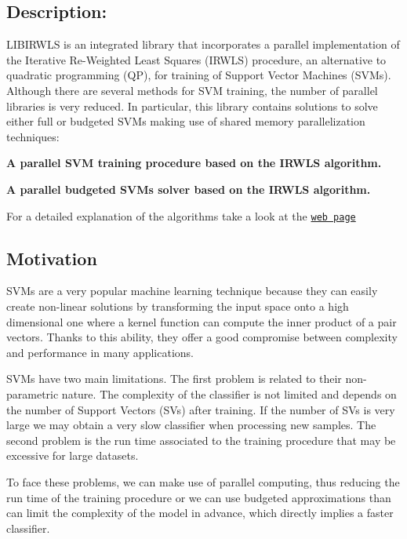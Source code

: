 \subsection*{Description\+: }

L\+I\+B\+I\+R\+W\+LS is an integrated library that incorporates a parallel implementation of the Iterative Re-\/\+Weighted Least Squares (I\+R\+W\+LS) procedure, an alternative to quadratic programming (QP), for training of Support Vector Machines (S\+V\+Ms). Although there are several methods for S\+VM training, the number of parallel libraries is very reduced. In particular, this library contains solutions to solve either full or budgeted S\+V\+Ms making use of shared memory parallelization techniques\+:

{\bfseries A parallel S\+VM training procedure based on the I\+R\+W\+LS algorithm.}

{\bfseries A parallel budgeted S\+V\+Ms solver based on the I\+R\+W\+LS algorithm.}

For a detailed explanation of the algorithms take a look at the \href{https://robedm.github.io/LIBIRWLS/}{\tt web page}



\subsection*{Motivation }

S\+V\+Ms are a very popular machine learning technique because they can easily create non-\/linear solutions by transforming the input space onto a high dimensional one where a kernel function can compute the inner product of a pair vectors. Thanks to this ability, they offer a good compromise between complexity and performance in many applications.

S\+V\+Ms have two main limitations. The first problem is related to their non-\/parametric nature. The complexity of the classifier is not limited and depends on the number of Support Vectors (S\+Vs) after training. If the number of S\+Vs is very large we may obtain a very slow classifier when processing new samples. The second problem is the run time associated to the training procedure that may be excessive for large datasets.

To face these problems, we can make use of parallel computing, thus reducing the run time of the training procedure or we can use budgeted approximations than can limit the complexity of the model in advance, which directly implies a faster classifier.


